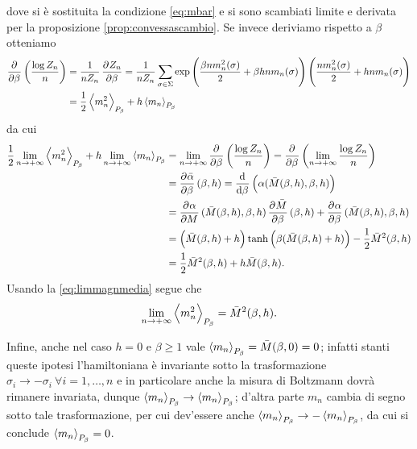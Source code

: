 dove si è sostituita la condizione \eqref{eq:mbar} e si sono scambiati limite e derivata per la proposizione \ref{prop:convessascambio}. Se invece deriviamo rispetto a $ \beta $ otteniamo
\begin{align*}
    \dpd{}{\beta} \left(\frac{\log Z_n}{n}\right) &= \frac{1}{n Z_n} \dpd{Z_n}{\beta} = \frac{1}{n Z_n} \sum_{\sigma \in \Sigma} \exp\left( \frac{\beta n m_n^2(\sigma)}{2} + \beta h n m_n(\sigma) \right) \left( \frac{n m_n^2(\sigma)}{2} + hnm_n(\sigma) \right) \\ &= \frac{1}{2} \mean{m_n^2}_{P_\beta} + h \mean{m_n}_{P_\beta}
\end{align*}
da cui
\begin{align*}
	\frac{1}{2}\lim_{n \to +\infty}\mean{m_n^2}_{P_\beta} + h\lim_{n \to +\infty}\mean{m_n}_{P_\beta}& = \lim_{n \to +\infty} \dpd{}{\beta} \left(\frac{\log Z_n}{n}\right) = \dpd{}{\beta} \left( \lim_{n \to +\infty}\frac{\log Z_n}{n} \right) \\
                                               & = \dpd{\bar{\alpha}}{\beta}(\beta,h) = \dod{}{\beta}\left(\alpha(\bar{M}(\beta,h),\beta,h)\right) \\
                                               & = \dpd{\alpha}{M}(\bar{M}(\beta,h),\beta,h) \dpd{\bar{M}}{\beta}(\beta,h) + \dpd{\alpha}{\beta}(\bar{M}(\beta,h),\beta,h) \\
                                               & = \left(\bar{M}(\beta,h) + h\right) \tanh\left(\beta(\bar{M}(\beta,h)+ h)\right) - \frac{1}{2}\bar{M}^2(\beta,h)\\
                                               & = \frac{1}{2}\bar{M}^2(\beta,h) + h \bar{M}(\beta,h).
\end{align*}
Usando la \ref{eq:limmagnmedia} segue che
\[ \lim_{n \to +\infty} \left< m_n^2 \right>_{P_\beta} = \bar{M}^2(\beta,h). \]

Infine, anche nel caso $ h=0 $ e $ \beta \geq 1 $ vale $ \left< m_n \right>_{P_\beta} = \bar{M}(\beta,0) = 0$; infatti stanti queste ipotesi l'hamiltoniana è invariante sotto la trasformazione $ \sigma_i \to -\sigma_i \ \forall i = 1,\ldots,n$ e in particolare anche la misura di Boltzmann dovrà rimanere invariata, dunque $ \left< m_n \right>_{P_\beta} \to \left< m_n \right>_{P_\beta} $; d'altra parte $ m_n $ cambia di segno sotto tale trasformazione, per cui dev'essere anche $ \left< m_n \right>_{P_\beta} \to -\left< m_n \right>_{P_\beta} $, da cui si conclude $ \left< m_n \right>_{P_\beta} = 0 $.
